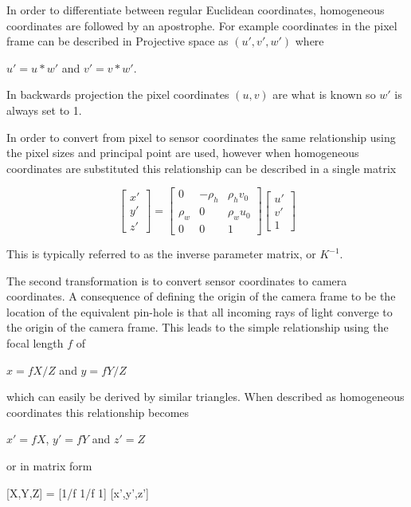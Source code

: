  In order to differentiate between regular Euclidean coordinates, homogeneous coordinates are followed by an apostrophe.  For example coordinates in the pixel frame can be described in Projective space as $(u',v',w')$ where 
 
 \begin{center}
 $u' = u*w'$ and $v'=v*w'$.
 \end{center}
 
 In backwards projection the pixel coordinates $(u,v)$ are what is known so $w'$ is always set to 1.  
 
 In order to convert from pixel to sensor coordinates the same relationship using the pixel sizes and principal point are used, however when homogeneous coordinates are substituted this relationship can be described in a single matrix
 
 \[
 \begin{bmatrix} x' \\ y' \\ z' \end{bmatrix}
 =
 \begin{bmatrix} 
     0   & -\rho_h & \rho_h v_0 \\ 
  \rho_w &    0    & \rho_w u_0 \\
     0   &    0    &      1  
 \end{bmatrix}
 \begin{bmatrix} u' \\ v' \\ 1 \end{bmatrix}
 \]
 
 This is typically referred to as the inverse parameter matrix, or $K^{-1}$.
 
 The second transformation is to convert sensor coordinates to camera coordinates.  A consequence of defining the origin of the camera frame to be the location of the equivalent pin-hole is that all incoming rays of light converge to the origin of the camera frame.  This leads to the simple relationship using the focal length $f$ of
  
  \begin{center}
  $x=fX/Z$  and $y=fY/Z$
  \end{center}
 
  which can easily be derived by similar triangles.  When described as homogeneous coordinates this relationship becomes 
  
  \begin{center}
  $x'=fX$, $y'=fY$ and $z'=Z$
  \end{center}
  
  or in matrix form
  
  [X,Y,Z] = [1/f 1/f 1] [x',y',z']
  
  
  
  
  